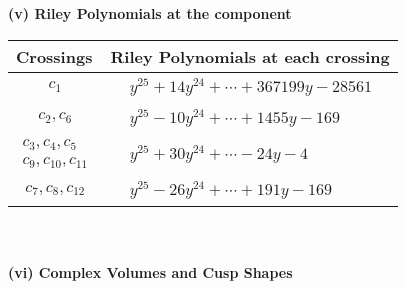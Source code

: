 \documentclass[1p]{elsarticle_modified}
\theoremstyle{definition}
\begin{document}
\newpage\renewcommand{\arraystretch}{1}
\flushleft \textbf{(v) Riley Polynomials at the component}\newline \\
\begin{tabular}{m{50pt}|m{274pt}}
Crossings & \hspace{64pt}Riley Polynomials at each crossing \\
\hline $$\begin{aligned}c_{1}\end{aligned}$$&$\begin{aligned}
&y^{25}+14 y^{24}+\cdots+367199 y-28561
\end{aligned}$\\
\hline $$\begin{aligned}c_{2},c_{6}\end{aligned}$$&$\begin{aligned}
&y^{25}-10 y^{24}+\cdots+1455 y-169
\end{aligned}$\\
\hline $$\begin{aligned}c_{3},c_{4},c_{5}\\c_{9},c_{10},c_{11}\end{aligned}$$&$\begin{aligned}
&y^{25}+30 y^{24}+\cdots-24 y-4
\end{aligned}$\\
\hline $$\begin{aligned}c_{7},c_{8},c_{12}\end{aligned}$$&$\begin{aligned}
&y^{25}-26 y^{24}+\cdots+191 y-169
\end{aligned}$\\
\hline
\end{tabular}\\~\\
\newpage\flushleft \textbf{(vi) Complex Volumes and Cusp Shapes}
\end{document}
